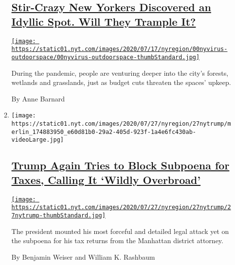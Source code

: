 \begin{enumerate}
\begin{enumerate}
    \hypertarget{stir-crazy-new-yorkers-discovered-an-idyllic-spot-will-they-trample-it}{%
    \subsection{\texorpdfstring{\href{/2020/07/28/nyregion/nyc-parks-coronavirus.html}{Stir-Crazy
    New Yorkers Discovered an Idyllic Spot. Will They Trample
    It?}}{Stir-Crazy New Yorkers Discovered an Idyllic Spot. Will They Trample It?}}\label{stir-crazy-new-yorkers-discovered-an-idyllic-spot-will-they-trample-it}}

    \href{/2020/07/28/nyregion/nyc-parks-coronavirus.html}{\texttt{[image: https://static01.nyt.com/images/2020/07/17/nyregion/00nyvirus-outdoorspace/00nyvirus-outdoorspace-thumbStandard.jpg]}}

    During the pandemic, people are venturing deeper into the city's
    forests, wetlands and grasslands, just as budget cuts threaten the
    spaces' upkeep.

    By Anne Barnard
  \item
    \texttt{[image: https://static01.nyt.com/images/2020/07/27/nyregion/27nytrump/merlin\_174883950\_e60d81b0-29a2-405d-923f-1a4e6fc430ab-videoLarge.jpg]}

    \hypertarget{trump-again-tries-to-block-subpoena-for-taxes-calling-it-wildly-overbroad}{%
    \subsection{\texorpdfstring{\href{/2020/07/27/nyregion/donald-trump-taxes-cyrus-vance.html}{Trump
    Again Tries to Block Subpoena for Taxes, Calling It `Wildly
    Overbroad'}}{Trump Again Tries to Block Subpoena for Taxes, Calling It `Wildly Overbroad'}}\label{trump-again-tries-to-block-subpoena-for-taxes-calling-it-wildly-overbroad}}

    \href{/2020/07/27/nyregion/donald-trump-taxes-cyrus-vance.html}{\texttt{[image: https://static01.nyt.com/images/2020/07/27/nyregion/27nytrump/27nytrump-thumbStandard.jpg]}}

    The president mounted his most forceful and detailed legal attack
    yet on the subpoena for his tax returns from the Manhattan district
    attorney.

    By Benjamin Weiser and William K. Rashbaum
  \end{enumerate}
\end{enumerate}

